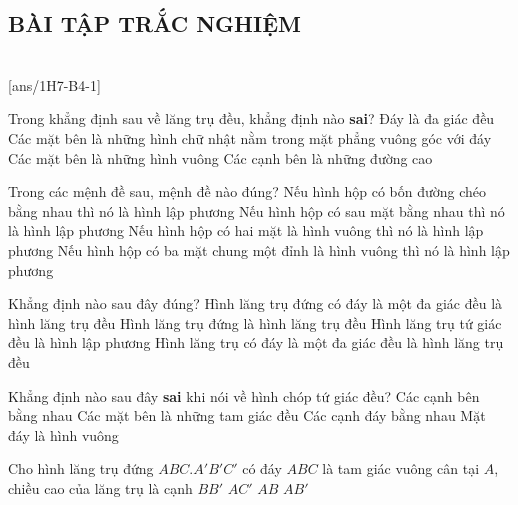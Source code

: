 \subsection{BÀI TẬP TRẮC NGHIỆM}
 \\
\setcounter{ex}{0}
[ans/1H7-B4-1]
\begin{ex}%
	Trong khẳng định sau về lăng trụ đều, khẳng định nào \textbf{sai}?
	\choice
	{Đáy là đa giác đều}
	{Các mặt bên là những hình chữ nhật nằm trong mặt phẳng vuông góc với đáy}
	{\True Các mặt bên là những hình vuông}
	{Các cạnh bên là những đường cao}
\end{ex}

\begin{ex}%
	Trong các mệnh đề sau, mệnh đề nào đúng?
	\choice
	{Nếu hình hộp có bốn đường chéo bằng nhau thì nó là hình lập phương}
	{Nếu hình hộp có sau mặt bằng nhau thì nó là hình lập phương}
	{Nếu hình hộp có hai mặt là hình vuông thì nó là hình lập phương}
	{\True Nếu hình hộp có ba mặt chung một đỉnh là hình vuông thì nó là hình lập phương}
\end{ex}

\begin{ex}%
	Khẳng định nào sau đây đúng?
	\choice
	{\True Hình lăng trụ đứng có đáy là một đa giác đều là hình lăng trụ đều}
	{Hình lăng trụ đứng là hình lăng trụ đều}
	{Hình lăng trụ tứ giác đều là hình lập phương}
	{Hình lăng trụ có đáy là một đa giác đều là hình lăng trụ đều}
\end{ex}

\begin{ex}
	Khẳng định nào sau đây \textbf{sai} khi nói về hình chóp tứ giác đều?
	\choice
	{Các cạnh bên bằng nhau}
	{\True Các mặt bên là những tam giác đều}
	{Các cạnh đáy bằng nhau }
	{ Mặt đáy là hình vuông}
\end{ex}

\begin{ex}%
	Cho hình lăng trụ đứng $ABC.A'B'C'$ có đáy $ABC$ là tam giác vuông cân tại $A$, chiều cao của lăng trụ là cạnh
	\choice
	{\True $BB'$}
	{$AC'$}
	{ $AB$}
	{$AB'$}
\end{ex}

